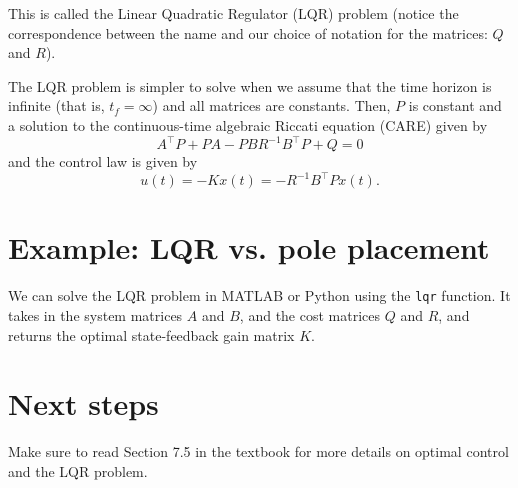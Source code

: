\documentclass{ee122_notes}
\begin{document}
This is called the Linear Quadratic Regulator (LQR) problem (notice the correspondence between the name and our choice of notation for the matrices: $Q$ and $R$). 

The LQR problem is simpler to solve when we assume that the time horizon is infinite (that is, $t_f = \infty$) and
all matrices are constants. Then, $P$ is constant and a solution to the continuous-time algebraic Riccati equation (CARE) given by
\begin{equation}
A^\top P + PA - PB R^{-1} B^\top P + Q = 0
\end{equation}
and the control law is given by 
\begin{equation}
    u(t) = -Kx(t) = -R^{-1} B^\top P x(t).
\end{equation}

\section{Example: LQR vs. pole placement}
We can solve the LQR problem in MATLAB or Python using the \texttt{lqr} function. It takes in the system matrices $A$ and $B$, and the cost matrices $Q$ and $R$, and returns the optimal state-feedback gain matrix $K$. 

\section{Next steps}
Make sure to read Section 7.5 in the textbook for more details on optimal control and the LQR problem. 
\end{document}
